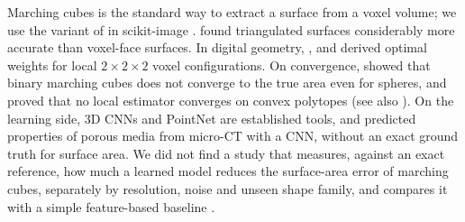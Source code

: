 Marching cubes \citep{lorensen1987} is the standard way to extract a surface from a voxel volume; we use
the variant of \citet{lewiner2003} in scikit-image \citep{vanderwalt2014}. \citet{nystrom2002} found
triangulated surfaces considerably more accurate than voxel-face surfaces. In digital geometry,
\citet{mullikin1993}, \citet{windreich2003} and \citet{lindblad2005} derived optimal weights for local
$2\times2\times2$ voxel configurations. On convergence, \citet{kenmochi2000} showed that binary marching
cubes does not converge to the true area even for spheres, and \citet{svane2013} proved that no local
estimator converges on convex polytopes (see also \citet{ziegel2010,klette2004}). On the learning side,
3D CNNs \citep{maturana2015} and PointNet \citep{qi2017} are established tools, and
\citet{rabbani2020} predicted properties of porous media from micro-CT with a CNN, without an exact
ground truth for surface area. We did not find a study that measures, against an exact reference, how
much a learned model reduces the surface-area error of marching cubes, separately by resolution, noise
and unseen shape family, and compares it with a simple feature-based baseline \citep{breiman2001}.
